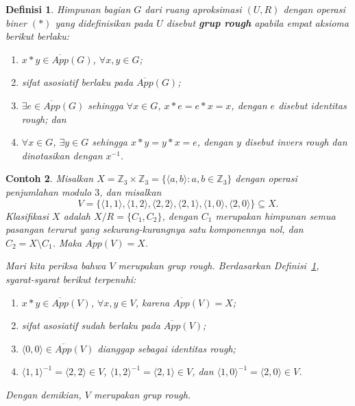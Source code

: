 \documentclass[a4paper,11pt]{article}
\theoremstyle{plain}
\newtheorem{definisi}{Definisi}
\newtheorem{contoh}[definisi]{Contoh}
\newcommand{\Z}{\mathbb{Z}}
\newcommand{\upp}[1]{\overline{App}(#1)}
\begin{document}
\begin{definisi}\label{def:4}
      Himpunan bagian $G$ dari ruang aproksimasi $(U,R)$ dengan operasi biner
      $(*)$ yang didefinisikan pada $U$ disebut \textbf{grup rough} apabila
      empat aksioma berikut berlaku:
      \begin{enumerate}
            \item $x*y\in\upp{G}$, $\forall x,y\in G$;
            \item sifat asosiatif berlaku pada $\upp{G}$;
            \item $\exists e\in\upp{G}$ sehingga $\forall x\in G$,
                  $x*e=e*x=x$, dengan $e$ disebut identitas rough; dan
            \item $\forall x\in G$, $\exists y\in G$ sehingga $x*y=y*x=e$,
                  dengan $y$ disebut invers rough dan dinotasikan dengan $x^{-1}$.
      \end{enumerate}
\end{definisi}

\begin{contoh}\label{ex:5}
      Misalkan $X=\Z_3\times\Z_3=\{\langle a,b\rangle:a,b\in\Z_3\}$
      dengan operasi penjumlahan modulo $3$, dan misalkan
      \[
            V=\{\langle1,1\rangle,\langle1,2\rangle,\langle2,2\rangle,
            \langle2,1\rangle,\langle1,0\rangle,\langle2,0\rangle\}\subseteq X.
      \]
      Klasifikasi $X$ adalah $X/R=\{C_1,C_2\}$, dengan $C_1$ merupakan
      himpunan semua pasangan terurut yang sekurang-kurangnya satu
      komponennya nol, dan $C_2=X\setminus C_1$. Maka $\upp{V}=X$.

      Mari kita periksa bahwa $V$ merupakan grup rough. Berdasarkan
      Definisi~\ref{def:4}, syarat-syarat berikut terpenuhi:
      \begin{enumerate}
            \item $x*y\in\upp{V}$, $\forall x,y\in V$, karena $\upp{V}=X$;
            \item sifat asosiatif sudah berlaku pada $\upp{V}$;
            \item $\langle0,0\rangle\in\upp{V}$ dianggap sebagai identitas rough;
            \item $\langle1,1\rangle^{-1}=\langle2,2\rangle\in V$,
                  $\langle1,2\rangle^{-1}=\langle2,1\rangle\in V$, dan
                  $\langle1,0\rangle^{-1}=\langle2,0\rangle\in V$.
      \end{enumerate}
      Dengan demikian, $V$ merupakan grup rough.
\end{contoh}
\end{document}
